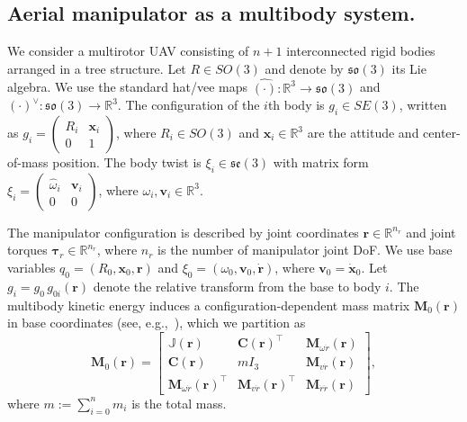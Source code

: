 \documentclass[letterpaper, 10 pt, conference]{ieeeconf}  %
\newcommand{\matr}[1]{\bm{#1}}
\newcommand{\R}{\matr{R}}
\newcommand{\0}{\matr{0}}
\newcommand{\SO}{\mathrm{SO}}
\begin{document}

\subsection{Aerial manipulator as a multibody system.}
\label{subsec:geom_prelim}



We consider a multirotor UAV consisting of $n{+}1$ interconnected rigid bodies arranged in a tree structure. Let $R\in SO(3)$ and denote by $\mathfrak{so}(3)$ its Lie algebra. We use the standard hat/vee maps
$\hat{(\cdot)}:\mathbb R^3\to\mathfrak{so}(3)$ and $(\cdot)^\vee:\mathfrak{so}(3)\to\mathbb R^3$.
The configuration of the $i$th body is $g_i\in SE(3)$, written as
$g_i=\begin{pmatrix}R_i & \mathbf x_i\\ 0&1\end{pmatrix}$, where $R_i\in SO(3)$ and
$\mathbf x_i\in\mathbb R^3$ are the attitude and center-of-mass position.
The body twist is $\xi_i\in\mathfrak{se}(3)$ with matrix form
$\xi_i=\begin{pmatrix}\hat\omega_i & \mathbf v_i\\ 0&0\end{pmatrix}$, where
$\omega_i,\mathbf v_i\in\mathbb R^3$.

The manipulator configuration is described by joint coordinates $\mathbf r\in\mathbb R^{n_r}$ and joint torques
$\boldsymbol{\tau}_r\in\mathbb R^{n_r}$, where $n_r$ is the number of manipulator joint DoF. We use base variables
$q_0=(R_0,\mathbf x_0,\mathbf r)$ and $\xi_0=(\omega_0,\mathbf v_0,\dot{\mathbf r})$, where $\mathbf v_0=\dot{\mathbf x}_0$.
Let $g_i=g_0\,g_{0i}(\mathbf r)$ denote the relative transform from the base to body $i$.
The multibody kinetic energy induces a configuration-dependent mass matrix $\mathbf M_0(\mathbf r)$ in base coordinates
(see, e.g.,~\cite{marin}), which we partition as
\begin{equation}
\mathbf M_0(\mathbf r)=
\begin{bmatrix}
\mathbb J(\mathbf r) & \mathbf C(\mathbf r)^{\!\top} & \mathbf M_{\omega\dot r}(\mathbf r)\\
\mathbf C(\mathbf r) & m I_3 & \mathbf M_{v\dot r}(\mathbf r)\\
\mathbf M_{\omega\dot r}(\mathbf r)^{\!\top} & \mathbf M_{v\dot r}(\mathbf r)^{\!\top} & \mathbf M_{\dot r\dot r}(\mathbf r)
\end{bmatrix},
\label{eq:M0_partition}
\end{equation}
where $m:=\sum_{i=0}^{n} m_i$ is the total mass.
\smallskip
\end{document}
